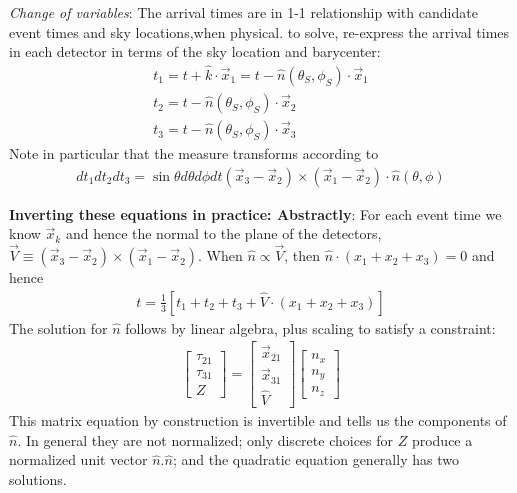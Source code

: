 \documentclass[twocolumn,prd,nofootinbib]{revtex4}
\begin{document}
\begin{widetext}
\noindent \emph{Change of variables}: The arrival times are in 1-1 relationship with candidate
event times and sky locations,when physical.  to solve, re-express the arrival times in each detector in terms of the
sky location and barycenter:
\begin{eqnarray}
t_1 = t + \hat{k}\cdot \vec{x}_1 
      = t - \hat{n}(\theta_S,\phi_S)\cdot \vec{x}_1 \\
t_2  = t - \hat{n}(\theta_S,\phi_S)\cdot \vec{x}_2 \\
t_3  = t - \hat{n}(\theta_S,\phi_S)\cdot \vec{x}_3 
\end{eqnarray}
Note in particular that the measure transforms according to
\begin{eqnarray}
 dt_1 dt_2 dt_3  = \sin\theta d\theta d\phi dt (\vec{x}_3-\vec{x}_2)\times(\vec{x}_1-\vec{x}_2)\cdot\hat{n}(\theta,\phi)
\end{eqnarray}

\begin{shaded}
\noindent \textbf{Inverting these equations in practice: Abstractly}: For each event time we know $\vec{x}_k$ and hence the normal
to the plane of the detectors, $\vec{V}\equiv (\vec{x}_3 -\vec{x}_2)\times(\vec{x}_1-\vec{x}_2)$.  When $\hat{n}\propto
\vec{V}$, then $\hat{n}\cdot (x_1+x_2+x_3)=0$ and hence
\begin{eqnarray}
t = \frac{1}{3}[t_1+t_2+t_3 + \hat{V}\cdot(x_1+x_2+x_3)] 
\end{eqnarray}
The solution for $\hat{n}$ follows by linear algebra, plus scaling to satisfy a constraint:
\begin{eqnarray}
\begin{bmatrix}
\tau_{21} \\ \tau_{31} \\ Z
\end{bmatrix}
=
\begin{bmatrix}
\vec{x}_{21} \\ \vec{x}_{31} \\  \hat{V}
\end{bmatrix}
\begin{bmatrix}
n_x \\ n_y \\ n_z
\end{bmatrix}
\end{eqnarray}
This matrix equation by construction is invertible and tells us the components of $\hat{n}$.  In general they are not
normalized; only discrete choices for $Z$ produce a normalized unit vector $\hat{n}.\hat{n}$; and the quadratic equation
generally has two solutions.


\end{shaded}
\end{widetext}
\end{document}
